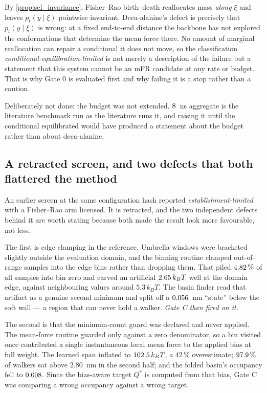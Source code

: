 \begin{remark}
\label{rem:deca_forecloses}
By \cref{prop:sel_invariance}, Fisher--Rao birth--death reallocates mass \emph{along} $\xi$ and
leaves $p_t(y \mid \xi)$ pointwise invariant. Deca-alanine's defect is precisely that
$p_t(y \mid \xi)$ is wrong: at a fixed end-to-end distance the backbone has not explored the
conformations that determine the mean force there. No amount of marginal reallocation can repair
a conditional it does not move, so the classification
\emph{conditional-equilibration-limited} is not merely a description of the failure but a
statement that this system cannot be an mFR candidate at any rate or budget. That is why Gate 0
is evaluated first and why failing it is a stop rather than a caution.
\end{remark}

Deliberately not done: the budget was not extended. $8$~ns aggregate is the
literature benchmark run as the literature runs it, and raising it until the conditional
equilibrated would have produced a statement about the budget rather than about deca-alanine.

\subsection{A retracted screen, and two defects that both flattered the method}
\label{sec:deca_retraction}

An earlier screen at the same configuration hash reported \emph{establishment-limited} with a
Fisher--Rao arm licensed. It is retracted, and the two independent defects behind it are worth
stating because both made the result look more favourable, not less.

The first is edge clamping in the reference. Umbrella windows were bracketed slightly outside the
evaluation domain, and the binning routine clamped out-of-range samples into the edge bins rather
than dropping them. That piled $4.82\,\%$ of all samples into bin zero and carved an
artificial $2.65\,k_BT$ well at the domain edge, against neighbouring values around
$5.3\,k_BT$. The basin finder read that artifact as a genuine second minimum and split off a
$0.056$~nm ``state'' below the soft wall --- a region that can never hold a walker.
\emph{Gate C then fired on it.}

The second is that the minimum-count guard was declared and never applied. The mean-force routine
guarded only against a zero denominator, so a bin visited once contributed a single instantaneous
local mean force to the applied bias at full weight. The learned span inflated to
$102.5\,k_BT$, a $42\,\%$ overestimate; $97.9\,\%$ of walkers sat above $2.80$~nm in
the second half; and the folded basin's occupancy fell to $0.008$. Since the bias-aware
target $Q^*$ is computed from that bias, Gate C was comparing a wrong occupancy against a wrong
target.

